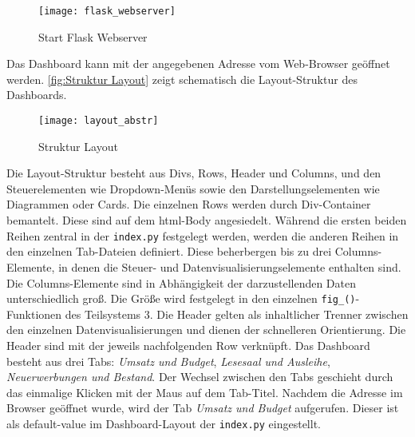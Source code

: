     \begin{figure}[H]
        \centering
            \texttt{[image: flask\_webserver]}
            \caption{Start Flask Webserver}
            \label{fig:flask}
    \end{figure}

    
    Das Dashboard kann mit der angegebenen Adresse vom Web-Browser geöffnet werden.
    \autoref{fig:Struktur Layout} zeigt schematisch die Layout-Struktur des Dashboards. 


    \begin{figure}[H]
        \centering
            \texttt{[image: layout\_abstr]}
            \caption{Struktur Layout}
            \label{fig:Struktur Layout}
    \end{figure}


    Die Layout-Struktur besteht aus Divs, Rows, Header und Columns, und den Steuerelementen wie Dropdown-Menüs sowie den Darstellungselementen wie Diagrammen oder
    Cards. Die einzelnen Rows werden durch Div-Container bemantelt. Diese sind auf dem html-Body angesiedelt.
    Während die ersten beiden Reihen zentral in der \texttt{index.py} festgelegt werden, werden die anderen Reihen in den einzelnen Tab-Dateien definiert. 
    Diese beherbergen bis zu drei Columns-Elemente, in denen die Steuer- und Datenvisualisierungselemente enthalten sind.
    Die Columns-Elemente sind in Abhängigkeit der darzustellenden Daten unterschiedlich groß. 
    Die Größe wird festgelegt in den einzelnen \texttt{fig\_()}-Funktionen des Teilsystems 3.
    Die Header gelten als inhaltlicher Trenner zwischen den einzelnen Datenvisualisierungen und dienen der schnelleren Orientierung. 
    Die Header sind mit der jeweils nachfolgenden Row verknüpft. Das Dashboard besteht aus drei Tabs: \textit{Umsatz und Budget}, 
    \textit{Lesesaal und Ausleihe}, \textit{Neuerwerbungen und Bestand}. Der Wechsel zwischen den Tabs geschieht durch das einmalige
    Klicken mit der Maus auf dem Tab-Titel. Nachdem die Adresse im Browser geöffnet wurde, wird der Tab \textit{Umsatz und Budget} aufgerufen. Dieser ist
    als default-value im Dashboard-Layout der \texttt{index.py} eingestellt.

